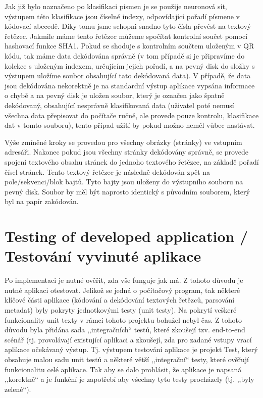 \documentclass[conference]{IEEEtran}
\begin{document}
Jak již bylo naznačeno po klasifikaci písmen je se použije neuronová sít, výstupem této klasifikace jsou číselné indexy, odpovídající pořadí písmene v kódovací abecedě. Díky tomu jsme schopni snadno tyto čísla převést na textový řetězec. Jakmile máme tento řetězec můžeme spočítat kontrolní součet pomocí hashovací funkce SHA1. Pokud se shoduje s kontrolním součtem uloženým v QR kódu, tak máme data dekódována správně (v tom případě si je připravíme do kolekce s uloženým indexem, určujícím jejich pořadí, a na pevný disk do složky s výstupem uložíme soubor obsahující tato dekódovaná data). V případě, že data jsou dekódována nekorektně je na standardní výstup aplikace vypsána informace o chybě a na pevný disk je uložen soubor, který je označen jako špatně dekódovaný, obsahující nesprávně klasifikovaná data (uživatel poté nemusí všechna data přepisovat do počítače ručně, ale provede pouze kontrolu, klasifikace dat v tomto souboru), tento případ užití by pokud možno neměl vůbec nastávat.

Výše zmíněné kroky se provedou pro všechny obrázky (stránky) ve vstupním adresáři. Nakonec pokud jsou všechny stránky dekódovány správně, se provede spojení textového obsahu stránek do jednoho textového řetězce, na základě pořadí čísel stránek. Tento textový řetězec je následně dekódován zpět na pole/sekvenci/blok bajtů. Tyto bajty jsou uloženy do výstupního souboru na pevný disk. Soubor by měl být naprosto identický s původním souborem, který byl na papír zakódován.

\section{Testing of developed application / Testování vyvinuté aplikace}

Po implementaci je nutné ověřit, zda vše funguje jak má. Z tohoto důvodu je nutné aplikaci otestovat. Jelikož se jedná o počítačový program, tak některé klíčové části aplikace (kódování a dekódování textových řetězců, parsování metadat) byly pokryty jednotkovými testy (unit testy). Na pokrytí veškeré funkcionality unit texty v rámci tohoto projektu bohužel nebyl čas. Z tohoto důvodu byla přidána sada ,,integračních`` testů, které zkoušejí tzv. end-to-end scénář (tj. provolávají existující aplikaci a zkoušejí, zda pro zadané vstupy vrací aplikace očekávaný výstup. Tj. výstupem testování aplikace je projekt Test, který obsahuje malou sadu unit testů a některé větší ,,integrační`` testy, které ověřují funkcionalitu celé aplikace. Tak aby se dalo prohlásit, že aplikace je napsaná ,,korektně`` a je funkční je zapotřebí aby všechny tyto testy procházely (tj. ,,byly zelené``).
\end{document}
